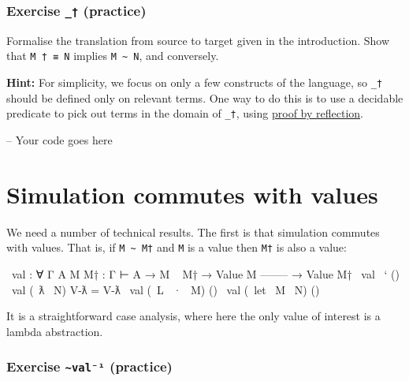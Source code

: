 \hypertarget{exercise-_-practice}{%
\subsubsection{\texorpdfstring{Exercise \texttt{\_†}
(practice)}{Exercise \_† (practice)}}\label{exercise-_-practice}}

Formalise the translation from source to target given in the
introduction. Show that \texttt{M\ †\ ≡\ N} implies
\texttt{M\ \textasciitilde{}\ N}, and conversely.

\textbf{Hint:} For simplicity, we focus on only a few constructs of the
language, so \texttt{\_†} should be defined only on relevant terms. One
way to do this is to use a decidable predicate to pick out terms in the
domain of \texttt{\_†}, using
\protect\hyperlink{Decidable-proof-by-reflection}{proof by reflection}.

\begin{fence}
\begin{code}
-- Your code goes here
\end{code}
\end{fence}

\hypertarget{simulation-commutes-with-values}{%
\section{Simulation commutes with
values}\label{simulation-commutes-with-values}}

We need a number of technical results. The first is that simulation
commutes with values. That is, if \texttt{M\ \textasciitilde{}\ M†} and
\texttt{M} is a value then \texttt{M†} is also a value:

\begin{fence}
\begin{code}
~val : ∀ {Γ A} {M M† : Γ ⊢ A}
  → M ~ M†
  → Value M
    --------
  → Value M†
~val ~`           ()
~val (~ƛ ~N)      V-ƛ  =  V-ƛ
~val (~L ~· ~M)   ()
~val (~let ~M ~N) ()
\end{code}
\end{fence}

It is a straightforward case analysis, where here the only value of
interest is a lambda abstraction.

\hypertarget{exercise-valuxb9-practice}{%
\subsubsection{\texorpdfstring{Exercise \texttt{\textasciitilde{}val⁻¹}
(practice)}{Exercise \textasciitilde val⁻¹ (practice)}}\label{exercise-valuxb9-practice}}

